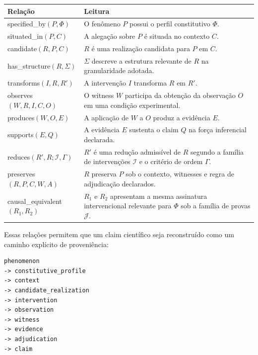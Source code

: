 \documentclass[11pt,a4paper]{article}
\begin{document}
\begin{longtable}{>{\ttfamily}p{5.2cm}p{8.9cm}}
\toprule
Relação & Leitura \\
\midrule
\endhead
specified\_by$(P,\Phi)$ &
O fenômeno $P$ possui o perfil constitutivo $\Phi$. \\

situated\_in$(P,C)$ &
A alegação sobre $P$ é situada no contexto $C$. \\

candidate$(R,P,C)$ &
$R$ é uma realização candidata para $P$ em $C$. \\

has\_structure$(R,\Sigma)$ &
$\Sigma$ descreve a estrutura relevante de $R$ na granularidade adotada. \\

transforms$(I,R,R')$ &
A intervenção $I$ transforma $R$ em $R'$. \\

observes$(W,R,I,C,O)$ &
O witness $W$ participa da obtenção da observação $O$ em uma condição experimental. \\

produces$(W,O,E)$ &
A aplicação de $W$ a $O$ produz a evidência $E$. \\

supports$(E,Q)$ &
A evidência $E$ sustenta o claim $Q$ na força inferencial declarada. \\

reduces$(R',R;\mathcal I,\Gamma)$ &
$R'$ é uma redução admissível de $R$ segundo a família de intervenções $\mathcal I$
e o critério de ordem $\Gamma$. \\

preserves$(R,P,C,W,A)$ &
$R$ preserva $P$ sob o contexto, witnesses e regra de adjudicação declarados. \\

causal\_equivalent$(R_1,R_2)$ &
$R_1$ e $R_2$ apresentam a mesma assinatura intervencional relevante para $\Phi$ sob
a família de provas $\mathcal J$. \\
\bottomrule
\end{longtable}

Essas relações permitem que um claim científico seja reconstruído como um caminho
explícito de proveniência:

\begin{lstlisting}
phenomenon
-> constitutive_profile
-> context
-> candidate_realization
-> intervention
-> observation
-> witness
-> evidence
-> adjudication
-> claim
\end{lstlisting}
\end{document}
